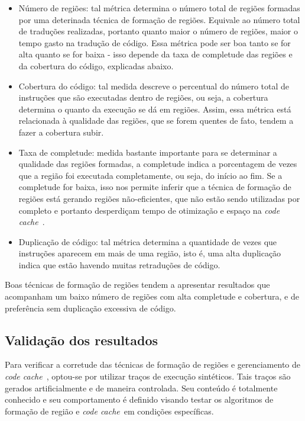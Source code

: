 \documentclass[11pt,twoside]{article}
\newcommand{\ccache}{\emph{code cache}}
\begin{document}
\begin{itemize}
\item Número de regiões: tal métrica determina o número total de regiões formadas por uma deterinada técnica de formação de regiões. Equivale ao número total de traduções realizadas, portanto quanto maior o número de regiões, maior o tempo gasto na tradução de código. Essa métrica pode ser boa tanto se for alta quanto se for baixa - isso depende da taxa de completude das regiões e da cobertura do código, explicadas abaixo.

\item Cobertura do código: tal medida descreve o percentual do número total de instruções que são executadas dentro de regiões, ou seja, a cobertura determina o quanto da execução se dá em regiões. Assim, essa métrica está relacionada à qualidade das regiões, que se forem quentes de fato, tendem a fazer a cobertura subir.

\item Taxa de completude: medida bastante importante para se determinar a qualidade das regiões formadas, a completude indica a porcentagem de vezes que a região foi executada completamente, ou seja, do início ao fim. Se a completude for baixa, isso nos permite inferir que a técnica de formação de regiões está gerando regiões não-eficientes, que não estão sendo utilizadas por completo e portanto desperdiçam tempo de otimização e espaço na \ccache~.

\item Duplicação de código: tal métrica determina a quantidade de vezes que instruções aparecem em mais de uma região, isto é, uma alta duplicação indica que estão havendo muitas retraduções de código.
\end{itemize}
Boas técnicas de formação de regiões tendem a apresentar resultados que acompanham um baixo número de regiões com alta completude e cobertura, e de preferência sem duplicação excessiva de código.


\subsection{Validação dos resultados}
Para verificar a corretude das técnicas de formação de regiões e gerenciamento de \ccache~, optou-se por utilizar traços de execução sintéticos. Tais traços são gerados artificialmente e de maneira controlada. Seu conteúdo é totalmente conhecido e seu comportamento é definido visando testar os algoritmos de formação de região e \ccache~em condições específicas.
\end{document}
